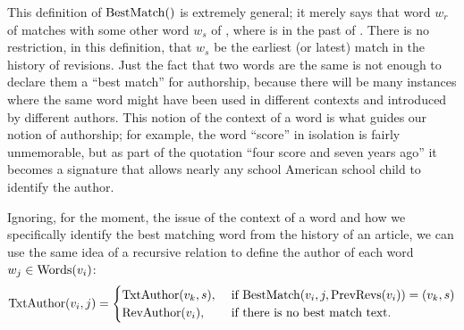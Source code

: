 This definition of $\mathrm{BestMatch}()$ is extremely general; it merely
says that word $w_r$ of  matches with some other word $w_s$
of , where  is in the past of .
There is no restriction, in this definition, that $w_s$ be the earliest
(or latest) match in the history of revisions.
Just the fact that two words are the same is not enough to declare them
a ``best match'' for authorship, because there will be many instances
where the same word might have been used in different contexts and
introduced by different authors.
This notion of the context of a word is what guides our notion of
authorship; for example, the word ``score'' in isolation is fairly
unmemorable, but as part of the quotation ``four score and seven years
ago'' it becomes a signature that allows nearly any school American
school child to identify the author.

Ignoring, for the moment, the issue of the context of a word and how we
specifically identify the best matching word from the history of an
article, we can use the same idea of a recursive relation to define
the author of each word $w_j \in \mathrm{Words}(v_{i})$:
\begin{equation}
\txtauthor{\version{i}, j} =
    \begin{cases}
	\txtauthor{\version{k}, s}, & \text{ if }
	\match{\version{i}, j, \prevrevs{\version{i}}} = (\version{k}, s) \\
	\revauthor{\version{i}}, & \text{ if there is no best match text. } \\
    \end{cases}
\label{def:txtauthor}
\end{equation}

